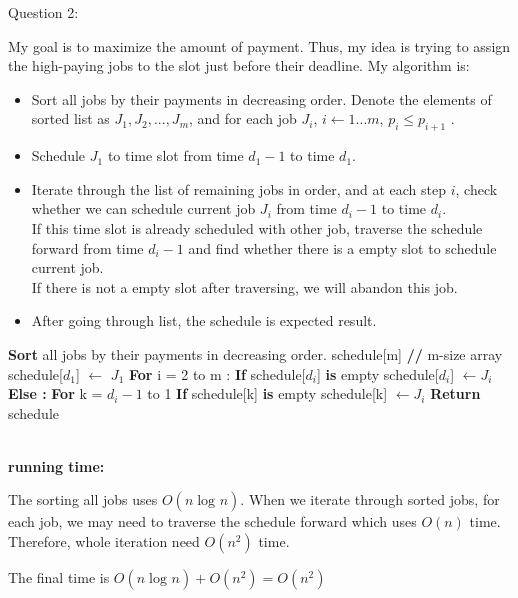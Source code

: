 \documentclass[12pt]{article}
\begin{document}
\pagebreak
\noindent
\large Question 2: \vspace{5mm} \par
\normalsize 
My goal is to maximize the amount of payment. Thus, my idea is trying to assign the high-paying jobs to the slot just before their deadline. My algorithm is:
\begin{itemize}
  \item	Sort all jobs by their payments in decreasing order. 
	Denote the elements of sorted list as $J_1, J_2, ..., J_m$, and for each job $J_i$, $i \leftarrow 1...m $, $p_i \leq p_{i+1}$ .
  \item	Schedule $J_1$ to time slot from time $d_1-1$ to time $d_1$. 
  \item Iterate through the list of remaining jobs in order, and at each step $i$, check whether we can schedule current job $J_i$ from time $d_i-1$ to time $d_i$. \\
	If this time slot is already scheduled with other job, traverse the schedule forward from time $d_i-1$ and find whether there is a empty slot to schedule current job. \\ 
	If there is not a empty slot after traversing, we will abandon this job.
  \item After going through list, the schedule is expected result. 
\end{itemize}

\begin{algorithm}
\begin{algorithmic}
\State \textbf{Sort} all jobs by their payments in decreasing order.
\State schedule[m] \textbf{ //} m-size array
\State schedule[$d_1$] $\leftarrow$ $J_1$
\State \textbf{For} i = 2 to m :
\State \hspace{0.4cm} \textbf{If} schedule[$d_i$] \textbf{is} empty
\State \hspace{0.8cm} \textbf{}schedule[$d_i$] $\leftarrow J_i$
\State \hspace{0.4cm} \textbf{Else :}
\State \hspace{0.8cm} \textbf{For} k = $d_i-1$ to 1
\State \hspace{1.2cm} \textbf{If} schedule[k] \textbf{is} empty
\State \hspace{1.6cm} \textbf{} schedule[k] $\leftarrow J_i$
\State \textbf{Return} schedule
\end{algorithmic}
\end{algorithm}
\noindent \\
\textbf{running time:} \par
The sorting all jobs uses $O(n\log_{}{n})$. 
When we iterate through sorted jobs, for each job, we may need to traverse the schedule forward which uses $O(n)$ time.
Therefore, whole iteration need $O(n^2)$ time. \par
The final time is $O(n\log_{}{n}) + O(n^2) = O(n^2)$
\end{document}

